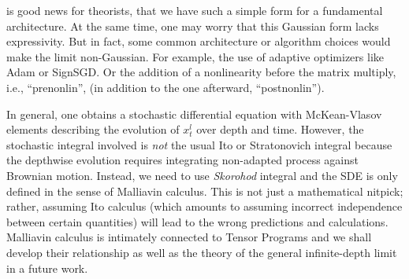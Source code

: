  is good news for theorists, that we have such a simple form for a fundamental architecture.
At the same time, one may worry that this Gaussian form lacks expressivity.
But in fact, some common architecture or algorithm choices would make the limit non-Gaussian.
For example, the use of adaptive optimizers like Adam or SignSGD.
Or the addition of a nonlinearity before the matrix multiply, i.e., ``prenonlin'', (in addition to the one afterward, ``postnonlin'').

In general, one obtains a stochastic differential equation with McKean-Vlasov elements describing the evolution of $x^l_t$ over depth and time. However, the stochastic integral involved is \emph{not} the usual Ito or Stratonovich integral because the depthwise evolution requires integrating non-adapted process against Brownian motion. Instead, we need to use \emph{Skorohod} integral and the SDE is only defined in the sense of Malliavin calculus.
This is not just a mathematical nitpick; rather, assuming Ito calculus (which amounts to assuming incorrect independence between certain quantities) will lead to the wrong predictions and calculations.
Malliavin calculus is intimately connected to Tensor Programs and we shall develop their relationship as well as the theory of the general infinite-depth limit in a future work.

